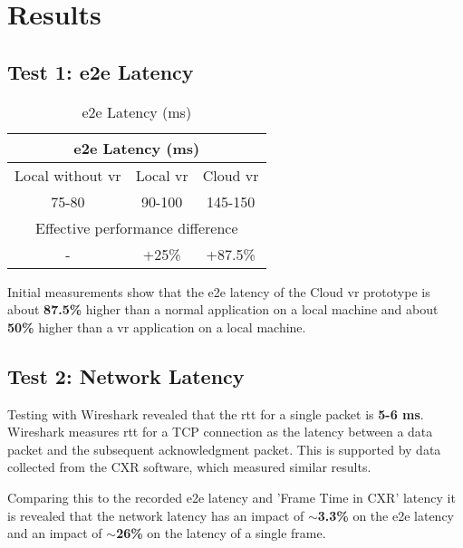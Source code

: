 \section{Results}

\subsection{Test 1: \acrfull{e2e} Latency}
\label{sec:res:t1}
\begin{table}[h!]
\begin{center}
\caption{\acrfull{e2e} Latency (ms)}
\begin{tabular}{ |c|c|c| }
\hline
\multicolumn{3}{|c|}{\acrfull{e2e} Latency (\acrshort{ms})}\\
\hline
\hline
Local without \acrshort{vr} & Local \acrshort{vr} & Cloud \acrshort{vr}\\
\hline
75-80 & 90-100 & 145-150\\
\hline
\multicolumn{3}{|c|}{Effective performance difference}\\
\hline
- & +25\% & +87.5\%\\
\hline
\end{tabular}
\end{center}
\end{table}

Initial measurements show that the \acrshort{e2e} latency of the Cloud \acrshort{vr} prototype is about \textbf{87.5\%} higher than a normal application on a local machine and about \textbf{50\%} higher than a \acrshort{vr} application on a local machine.

\subsection{Test 2: Network Latency}
\label{sec:res:t2}
Testing with Wireshark \parencite{wireshark} revealed that the \acrfull{rtt} for a single packet is \textbf{5-6 ms}. Wireshark measures \acrshort{rtt} for a TCP connection as the latency between a data packet and the subsequent acknowledgment packet. This is supported by data collected from the CXR \parencite{cloudxr} software, which measured similar results. 

Comparing this to the recorded \acrshort{e2e} latency and 'Frame Time in CXR' latency it is revealed that the network latency has an impact of \textbf{$\sim$3.3\%} on the \acrshort{e2e} latency and an impact of \textbf{$\sim$26\%} on the latency of a single frame.

\newpage

